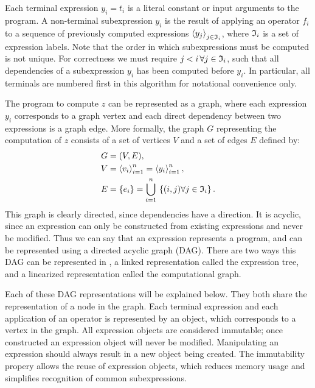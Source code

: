 Each terminal expression $y_i = t_i$ is a literal constant or input
arguments to the program.  A non-terminal subexpression $y_i$ is the
result of applying an operator $f_i$ to a sequence of previously
computed expressions $\left\langle{y_j}\right\rangle_{j\in\mathfrak{I}_i}$, where $\mathfrak{I}_i$ is a set
of expression labels.  Note that the order in which subexpressions must
be computed is not unique. For correctness we must require $j < i \,
\forall j \in \mathfrak{I}_i$, such that all dependencies of a subexpression
$y_i$ has been computed before $y_i$.  In particular, all terminals
are numbered first in this algorithm for notational convenience only.

The program to compute $z$ can be represented as a graph, where each expression $y_i$
corresponds to a graph vertex and each direct dependency between two
expressions is a graph edge. More formally, the graph $G$ representing
the computation of $z$ consists of a set of vertices $V$ and a set of
edges $E$ defined by:
\begin{align}
G &= (V, E), \label{ufl:eq:G} \\
V &= \left\langle{v_i}\right\rangle_{i=1}^n = \left\langle{y_i}\right\rangle_{i=1}^n, \label{ufl:eq:V} \\
E &= \{ e_i \} = \bigcup_{i=1}^n \, \left\{ (i, j) \forall j \in \mathfrak{I}_i \right\} . \label{ufl:eq:E}
\end{align}
This graph is clearly directed, since dependencies have a direction.
It is acyclic, since an expression can only be constructed from
existing expressions and never be modified.  Thus we can say that an
\ufl{} expression represents a program, and can be represented using a
directed acyclic graph (DAG).  There are two ways this DAG can be
represented in \ufl{}, a linked representation called the expression
tree, and a linearized representation called the computational graph.


Each of these DAG representations will be explained below.  They both
share the representation of a node in the graph.  Each terminal
expression and each application of an operator is represented by an
object, which corresponds to a vertex in the graph.  All expression
objects are considered immutable; once constructed an expression
object will never be modified.  Manipulating an expression should
always result in a new object being created.  The immutability propery
allows the reuse of expression objects, which reduces memory usage and
simplifies recognition of common subexpressions.


